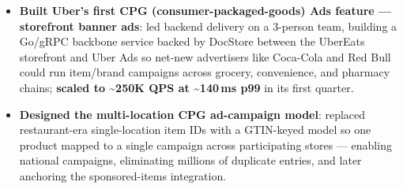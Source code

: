 \documentclass{resume}
\begin{document}
\begin{itemize}
  \item \textbf{Built Uber's first CPG (consumer-packaged-goods) Ads feature --- storefront banner ads}: led backend delivery on a 3-person team, building a Go/gRPC backbone service backed by DocStore between the UberEats storefront and Uber Ads so net-new advertisers like Coca-Cola and Red Bull could run item/brand campaigns across grocery, convenience, and pharmacy chains; \textbf{scaled to \textasciitilde250K QPS at \textasciitilde140\,ms p99} in its first quarter.
  \item \textbf{Designed the multi-location CPG ad-campaign model}: replaced restaurant-era single-location item IDs with a GTIN-keyed model so one product mapped to a single campaign across participating stores --- enabling national campaigns, eliminating millions of duplicate entries, and later anchoring the sponsored-items integration.

\end{itemize}
\end{document}
